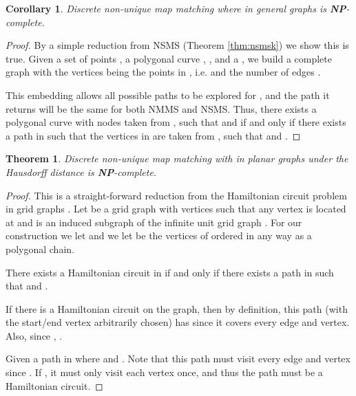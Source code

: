 \documentclass{article}[11pt]
\newcommand{\npc}{\textbf{NP}-complete}
\newtheorem{theorem}{Theorem}
\newtheorem{corollary}{Corollary}
\begin{document}
\begin{corollary} \label{thm:nmmskgen}
    Discrete non-unique map matching where  in general graphs is \npc .
\end{corollary}

\begin{proof}
    By a simple reduction from NSMS (Theorem \ref{thm:nsmsk}) we show this is true.
    Given a set of points , a polygonal curve , , and a , 
    we build a complete graph  with
    the vertices being the points in , i.e.  and the number of edges . 

    This embedding allows all possible paths to be
    explored for , and the path it returns will be the same for both NMMS and NSMS.
    Thus, there exists a polygonal curve  with nodes taken from , such that
     and  if and only if there exists a path 
    in  such that the vertices in  are taken from , such that
     and .
\hfill 
\end{proof}




\begin{theorem} \label{thm:nmmskhaus}
    Discrete non-unique map matching with  in planar graphs under the Hausdorff distance is \npc .
\end{theorem}



\begin{proof}
    This is a straight-forward reduction from the Hamiltonian circuit problem in grid graphs \cite{Itai:1982:SIAM}.
    Let  be a grid graph with  vertices such that any vertex  is located at 
     and  is an induced 
    subgraph of the infinite unit grid graph .
    For our construction we let  and we let  be the vertices  of  ordered in any way as
    a polygonal chain.
    
    There exists a Hamiltonian circuit in  if and only if 
    there exists a path  in  such that  and . 
    
    
    If there is a Hamiltonian circuit  on the graph, then by definition, this path 
    (with the start/end vertex arbitrarily chosen) has 
    since it covers every edge and vertex.  Also, since , . 
    
    Given a path  in  where  and . Note that
    this path must visit every edge and vertex since .  If ,
    it must only visit each vertex once, and thus the path must be a Hamiltonian
    circuit.
    \hfill 
\end{proof}
\end{document}
